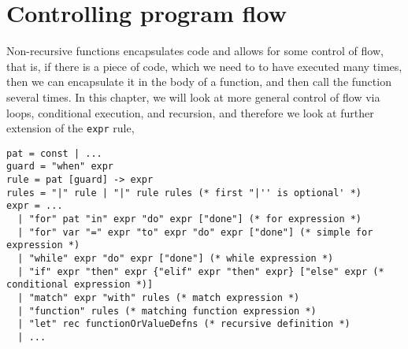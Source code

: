 \chapter{Controlling program flow}
\label{chap:flow}
Non-recursive functions encapsulates code and allows for some control of flow, that is, if there is a piece of code, which we need to to have executed many times, then we can encapsulate it in the body of a function, and then call the function several times. In this chapter, we will look at more general control of flow via loops, conditional execution, and recursion, and therefore we look at further extension of the \lstinline[language=ebnf]!expr! rule,
\begin{lstlisting}[language=ebnf]
pat = const | ...
guard = "when" expr
rule = pat [guard] -> expr
rules = "|" rule | "|" rule rules (* first "|'' is optional' *)
expr = ... 
  | "for" pat "in" expr "do" expr ["done"] (* for expression *)
  | "for" var "=" expr "to" expr "do" expr ["done"] (* simple for expression *)
  | "while" expr "do" expr ["done"] (* while expression *)
  | "if" expr "then" expr {"elif" expr "then" expr} ["else" expr (*  conditional expression *)]
  | "match" expr "with" rules (* match expression *)
  | "function" rules (* matching function expression *)
  | "let" rec functionOrValueDefns (* recursive definition *)
  | ...
\end{lstlisting}

